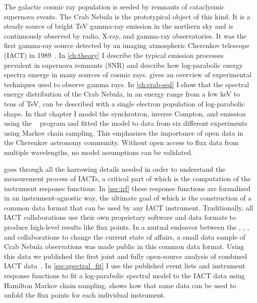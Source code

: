 The galactic cosmic ray population is seeded by remnants of cataclysmic supernova events.
The Crab Nebula is the prototypical object of this kind.  
It is a steady source of bright \si{TeV} gamma-ray emission in the northern sky and is 
continuously observed by radio, X-ray,  and gamma-ray observatories. 
It was the first gamma-ray source detected by an imaging atmospheric Cherenkov telescope (IACT) in 1989~\cite{whipple_crab}. 
In \cref{ch:theory} I describe the typical emission processes prevalent in supernova remnants (SNR) 
and describe how log-parabolic energy spectra emerge in many sources of cosmic rays.
 gives an overview of experimental techniques used to observe gamma rays. 
In \cref{ch:crab-sed} I show that the spectral energy distribution of the Crab Nebula,  in an energy range from 
a few \si{keV} to tens of \si{TeV}, can be described with a single electron population of log-parabolic shape.
In that chapter I model the synchrotron, inverse Compton, and \ssclong emission using the \naima~\cite{naima} program
and fitted the model to data from six different experiments using Markov chain sampling. 
This emphasizes the importance of open data in the Cherenkov astronomy community.
Without open access to flux data from multiple wavelengths, no model assumptions can be validated. 

 goes through all the harrowing details needed in order to understand the
measurement process of IACTs, a critical part of which is the 
computation of the instrument response functions. In \cref{sec:irf} these response functions are
formalized in an instrument-agnostic way, 
the ultimate goal of which is the construction of a common data format that can be used by any IACT instrument. 
Traditionally, all IACT collaborations use their own proprietary software and data formats to produce high-level results like flux points. 
In a mutual endeavor between the \magic, \hess, \veritas, and \fact collaborations to change the current state of affairs,
a small data sample of Crab Nebula observations was made public in this common data format. 
Using this data we published the first joint and fully open-source analysis of combined IACT data~\cite{joint_crab}.
In \cref{sec:spectral_fit} I use the published event lists and instrument response functions
to fit a log-parabolic spectral model to the IACT data using Hamilton Markov chain sampling. 
 shows how that same data can be used to unfold the flux points for each individual instrument.


